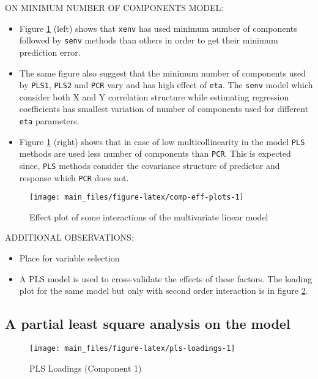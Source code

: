 \documentclass[12pt,3p,authoryear]{elsarticle}
\providecommand{\tightlist}{%
  \setlength{\itemsep}{0pt}\setlength{\parskip}{0pt}}
\theoremstyle{definition}
\theoremstyle{definition}
\theoremstyle{definition}
\theoremstyle{remark}
\begin{document}
ON MINIMUM NUMBER OF COMPONENTS MODEL:

\begin{itemize}
\tightlist
\item
  Figure \ref{fig:comp-eff-plots} (left) shows that \texttt{xenv} has
  used minimum number of components followed by \texttt{senv} methods
  than others in order to get their minimum prediction error.
\item
  The same figure also suggest that the minimum number of components
  used by \texttt{PLS1}, \texttt{PLS2} and \texttt{PCR} vary and has
  high effect of \texttt{eta}. The \texttt{senv} model which consider
  both X and Y correlation structure while estimating regression
  coefficients has smallest variation of number of components used for
  different \texttt{eta} parameters.
\item
  Figure \ref{fig:comp-eff-plots} (right) shows that in case of low
  multicollinearity in the model \texttt{PLS} methods are used less
  number of components than \texttt{PCR}. This is expected since,
  \texttt{PLS} methods consider the covariance structure of predictor
  and response which \texttt{PCR} does not.
\end{itemize}

\begin{figure}
\texttt{[image: main\_files/figure-latex/comp-eff-plots-1]} \caption{Effect plot of some interactions of the multivariate linear model}\label{fig:comp-eff-plots}
\end{figure}

ADDITIONAL OBSERVATIONS:

\begin{itemize}
\tightlist
\item
  Place for variable selection
\item
  A PLS model is used to cross-validate the effects of these factors.
  The loading plot for the same model but only with second order
  interaction is in figure \ref{fig:pls-loadings}.
\end{itemize}

\subsection{A partial least square analysis on the
model}\label{a-partial-least-square-analysis-on-the-model}

\begin{figure}
\texttt{[image: main\_files/figure-latex/pls-loadings-1]} \caption{PLS Loadings (Component 1)}\label{fig:pls-loadings}
\end{figure}
\end{document}
